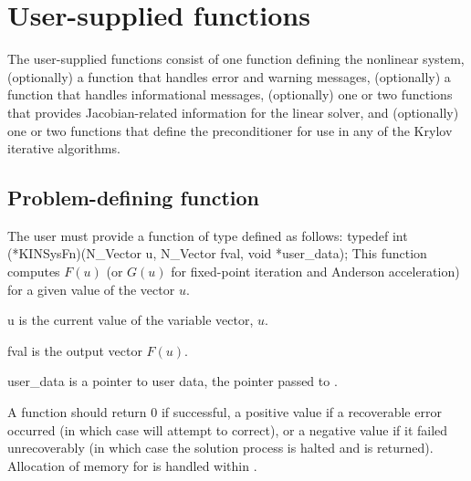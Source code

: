 \section{User-supplied functions}\label{ss:user_fct_sol}

The user-supplied functions consist of one function defining the nonlinear system,
(optionally) a function that handles error and warning messages,
(optionally) a function that handles informational messages,
(optionally) one or two functions that provides Jacobian-related information for the linear
solver, and (optionally) one or two functions that define the preconditioner for
use in any of the Krylov iterative algorithms.

\subsection{Problem-defining function}\label{ss:sysFn}

The user must provide a function of type  defined as follows:
{
  typedef int (*KINSysFn)(N\_Vector u, N\_Vector fval, void *user\_data);
}
{
  This function computes $F(u)$ (or $G(u)$ for fixed-point iteration and Anderson
  acceleration) for a given value of the vector $u$.
}
{
  \begin{args}
  \item[u]
    is the current value of the variable vector, $u$.
  \item[fval]
    is the output vector $F(u)$.
  \item[user\_data]
    is a pointer to user data, the pointer 
    passed to .
  \end{args}
}
{
  A  function should return $0$ if successful, a positive value
  if a recoverable error occurred (in which case {\kinsol} will attempt to
  correct), or a negative value if it failed unrecoverably (in which case
  the solution process is halted and  is returned).
}
{
  Allocation of memory for  is handled within {\kinsol}.
}

